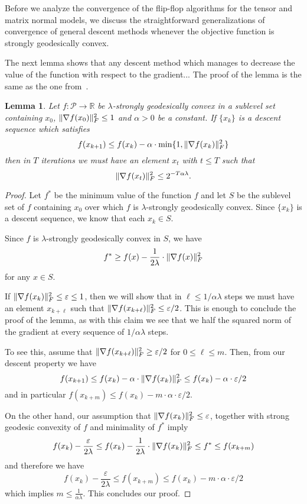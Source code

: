 \documentclass{article}
\newtheorem{lemma}[theorem]{Lemma}
\DeclarePairedDelimiter{\norm}{\lVert}{\rVert}
\newcommand{\R}{{\mathbb{R}}}
\newcommand\SPD{\mathcal{P}}
\begin{document}
Before we analyze the convergence of the flip-flop algorithms for the tensor and matrix normal models, we discuss the straightforward generalizations of convergence of general descent methods whenever the objective function is strongly geodesically convex.

The next lemma shows that any descent method which manages to decrease the value of the function with respect to the gradient...
The proof of the lemma is the same as the one from~\cite[Lemma 4.8]{FM20}.

\begin{lemma}\label{lem:descent-sublevel-set}
	Let $f : \SPD \rightarrow \R$ be $\lambda$-strongly geodesically convex in a sublevel set containing $x_0$, $\norm{\nabla f(x_0)}_F^2 \leq 1$ and $\alpha > 0$ be a constant.
	If $\{x_k\}$ is a descent sequence which satisfies 
	$$ f(x_{k+1}) \leq f(x_k) - \alpha \cdot \min\{1,  \norm{\nabla f(x_k)}^2_F \} $$
	then in $T$ iterations we must have an element $x_t$ with $t\leq T$ such that
	$$ \norm{\nabla f(x_t)}^2_F \leq 2^{-T \alpha \lambda}.   $$
\end{lemma}

\begin{proof}
	Let $f^*$ be the minimum value of the function $f$ and let $S$ be the sublevel set of $f$ containing $x_0$ over which $f$ is $\lambda$-strongly geodesically convex. Since $\{x_k\}$ is a descent sequence, we know that each $x_k \in S$.
	
	Since $f$ is $\lambda$-strongly geodesically convex in $S$, we have 
	$$ f^* \geq f(x) - \frac{1}{2\lambda} \cdot \norm{\nabla f(x)}_F^2 $$
	for any $x \in S$.
	
	If $\norm{\nabla f(x_k)}_F^2 \leq \varepsilon \leq 1$, then we will show that in $\ell \leq 1/\alpha \lambda$ steps we must have an element $x_{k+\ell}$ such that $\norm{\nabla f(x_{k + \ell})}_F^2 \leq \varepsilon/2$. This is enough to conclude the proof of the lemma, as with this claim we see that we half the squared norm of the gradient at every sequence of $1/\alpha \lambda$ steps.
	
	To see this, assume that $\norm{\nabla f(x_{k+\ell})}_F^2 \geq \varepsilon/2$ for $0 \leq \ell \leq m$. Then, from our descent property we have
	$$ f(x_{k+1}) \leq f(x_k) - \alpha \cdot \norm{\nabla f(x_k)}^2_F \leq f(x_k) - \alpha \cdot \varepsilon/2$$
	and in particular $f(x_{k + m}) \leq f(x_k) - m \cdot \alpha \cdot \varepsilon/2$. 
	
	On the other hand, our assumption that $\norm{\nabla f(x_k)}_F^2 \leq \varepsilon$, together with strong geodesic convexity of $f$ and minimality of $f^*$ imply 
	$$ f(x_{k}) - \frac{\varepsilon}{2\lambda} \leq f(x_{k}) - \frac{1}{2\lambda} \cdot \norm{\nabla f(x_k)}_F^2 \leq f^* \leq f(x_{k+m}) $$ 
	and therefore we have
	$$ f(x_{k}) - \frac{\varepsilon}{2\lambda} \leq f(x_{k + m}) \leq f(x_k) - m \cdot \alpha \cdot \varepsilon/2 $$
	which implies $m \leq \frac{1}{\alpha \lambda}$. This concludes our proof.
\end{proof}
\end{document}
